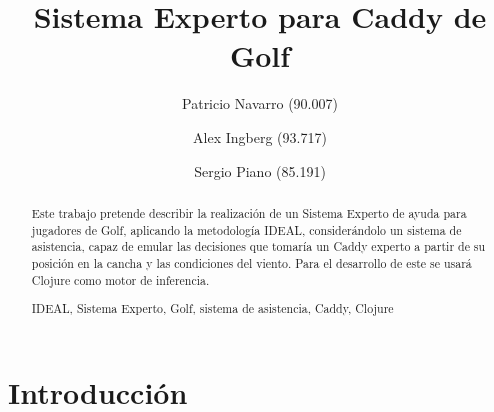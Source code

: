 \documentclass[runningheads,a4paper]{llncs}
\newcommand{\keywords}[1]{\par\addvspace\baselineskip
\noindent\keywordname\enspace\ignorespaces#1}
\begin{document}
\mainmatter  %

\title{Sistema Experto para Caddy de Golf}


%
%
\author{Patricio Navarro (90.007)\and Alex Ingberg (93.717)\and Sergio Piano (85.191)}
%


%
%

\maketitle


\begin{abstract}
  Este trabajo pretende describir la realización de un Sistema Experto de ayuda
  para jugadores de Golf, aplicando la metodología IDEAL, considerándolo un
  sistema de asistencia, capaz de emular las decisiones que tomaría un Caddy
  experto a partir de su posición en la cancha  y las condiciones del viento.
  Para el desarrollo de este se usará Clojure como motor de inferencia.
  \keywords{IDEAL, Sistema Experto, Golf, sistema de asistencia, Caddy,
  Clojure}
\end{abstract}


\section{Introducción}
\end{document}
